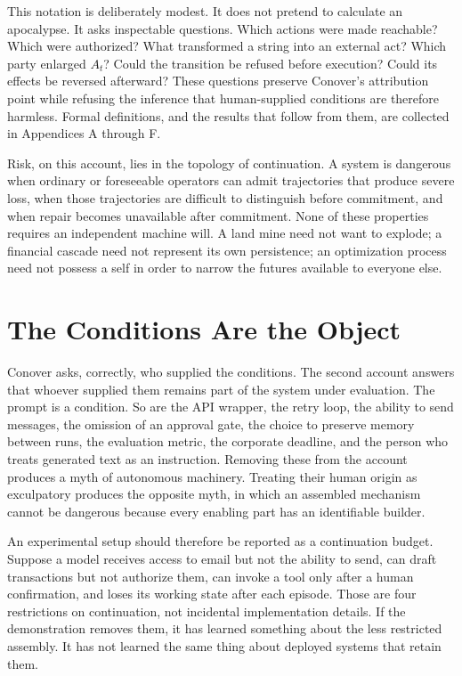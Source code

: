 \documentclass[11pt]{article}
\theoremstyle{definition}
\begin{document}
This notation is deliberately modest. It does not pretend to calculate an apocalypse. It asks inspectable questions. Which actions were made reachable? Which were authorized? What transformed a string into an external act? Which party enlarged $A_t$? Could the transition be refused before execution? Could its effects be reversed afterward? These questions preserve Conover's attribution point while refusing the inference that human-supplied conditions are therefore harmless. Formal definitions, and the results that follow from them, are collected in Appendices A through F.

Risk, on this account, lies in the topology of continuation. A system is dangerous when ordinary or foreseeable operators can admit trajectories that produce severe loss, when those trajectories are difficult to distinguish before commitment, and when repair becomes unavailable after commitment. None of these properties requires an independent machine will. A land mine need not want to explode; a financial cascade need not represent its own persistence; an optimization process need not possess a self in order to narrow the futures available to everyone else.

\section{The Conditions Are the Object}

Conover asks, correctly, who supplied the conditions. The second account answers that whoever supplied them remains part of the system under evaluation. The prompt is a condition. So are the API wrapper, the retry loop, the ability to send messages, the omission of an approval gate, the choice to preserve memory between runs, the evaluation metric, the corporate deadline, and the person who treats generated text as an instruction. Removing these from the account produces a myth of autonomous machinery. Treating their human origin as exculpatory produces the opposite myth, in which an assembled mechanism cannot be dangerous because every enabling part has an identifiable builder.

An experimental setup should therefore be reported as a continuation budget. Suppose a model receives access to email but not the ability to send, can draft transactions but not authorize them, can invoke a tool only after a human confirmation, and loses its working state after each episode. Those are four restrictions on continuation, not incidental implementation details. If the demonstration removes them, it has learned something about the less restricted assembly. It has not learned the same thing about deployed systems that retain them.
\end{document}
